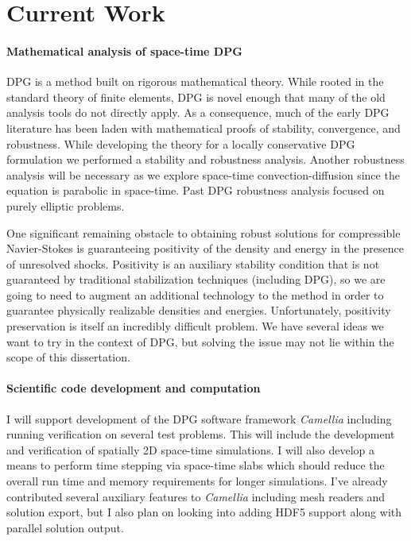 \documentclass[letterpaper]{article}
\begin{document}
\section{Current Work}
\paragraph{Mathematical analysis of space-time DPG}
DPG is a method built on rigorous mathematical theory.
While rooted in the standard theory of finite elements, DPG is novel enough that many of the old analysis tools do not directly apply.
As a consequence, much of the early DPG literature has been laden with mathematical proofs of stability, convergence, and robustness.
While developing the theory for a locally conservative DPG formulation we performed a stability and robustness analysis.
Another robustness analysis will be necessary as we explore space-time convection-diffusion since the equation is parabolic in space-time.
Past DPG robustness analysis focused on purely elliptic problems.

One significant remaining obstacle to obtaining robust solutions for compressible Navier-Stokes is guaranteeing positivity of the density and
energy in the presence of unresolved shocks. 
Positivity is an auxiliary stability condition that is not guaranteed by traditional stabilization 
techniques (including DPG), so we are going to need to augment an additional technology to the method in order to guarantee physically
realizable densities and energies. 
Unfortunately, positivity preservation is itself an incredibly difficult problem. 
We have several ideas we want to try in the context of DPG, but solving the issue may not lie within the scope of this dissertation.

\paragraph{Scientific code development and computation}
I will support development of the DPG software framework \emph{Camellia}\cite{Roberts2011} including running verification on several test problems.
This will include the development and verification of spatially 2D space-time simulations.
I will also develop a means to perform time stepping via space-time slabs which should reduce the 
overall run time and memory requirements for longer simulations.
I've already contributed several auxiliary features to \emph{Camellia} including mesh readers and solution export, 
but I also plan on looking into adding HDF5 support along with parallel solution output.
\end{document}
